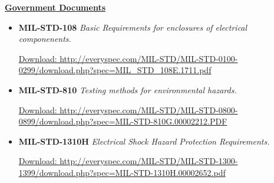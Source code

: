 \textbf{\underline{Government Documents}}

\begin{itemize}


		\item \textbf{MIL-STD-108} \textit{Basic Requirements for enclosures of electrical componenents.}
		
		\href{http://everyspec.com/MIL-STD/MIL-STD-0100-0299/download.php?spec=MIL\_STD\_108E.1711.pdf}{Download: http://everyspec.com/MIL-STD/MIL-STD-0100-0299/download.php?spec=MIL\_STD\_108E.1711.pdf}
		
		\item \textbf{MIL-STD-810} \textit{Testing methods for environmental hazards.}
		
		\href{http://everyspec.com/MIL-STD/MIL-STD-0800-0899/download.php?spec=MIL-STD-810G.00002212.PDF}{Download: http://everyspec.com/MIL-STD/MIL-STD-0800-0899/download.php?spec=MIL-STD-810G.00002212.PDF}
		
		\item \textbf{MIL-STD-1310H} \textit{Electrical Shock Hazard Protection Requirements.}

		\href{http://everyspec.com/MIL-STD/MIL-STD-1300-1399/download.php?spec=MIL-STD-1310H.00002652.pdf}{Download: http://everyspec.com/MIL-STD/MIL-STD-1300-1399/download.php?spec=MIL-STD-1310H.00002652.pdf}
		

		
		
		
	
\end{itemize}

%
%
%
